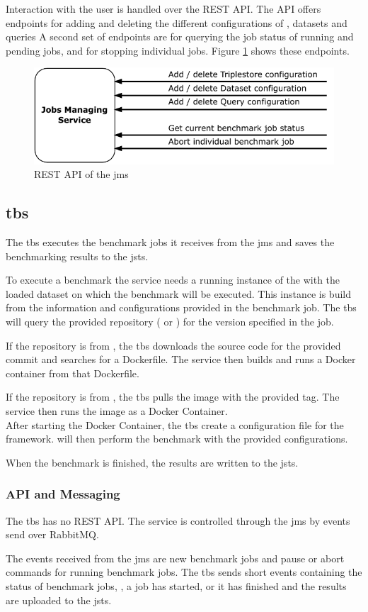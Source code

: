 Interaction with the user is handled over the REST API.
The API offers endpoints for adding and deleting the different configurations of \tsp{}, datasets and queries
A second set of endpoints are for querying the job status of running and pending jobs, and for stopping individual jobs.
Figure \ref{fig:rest_apis_approach_jms} shows these endpoints.
\begin{figure}[tbph]
	\centering
	\includegraphics[width=.57\textwidth]{figures/rest-apis-approach-jms.pdf}
	\caption{REST API of the \acl{jms}}
	\label{fig:rest_apis_approach_jms}
\end{figure}


\subsection{\acl{tbs}}
\label{sec:ts_benchmarking_service}
The \acf{tbs} executes the benchmark jobs it receives from the \ac{jms} and saves the benchmarking results to the \acl*{jsts}.

To execute a benchmark the service needs a running instance of the \ts{} with the loaded dataset on which the benchmark will be executed.
This instance is build from the information and configurations provided in the benchmark job.
The \ac{tbs} will query the provided repository (\gh{} or \dockh{}) for the version specified in the job.

If the repository is from \gh{}, the \ac{tbs} downloads the source code for the provided commit and searches for a Dockerfile.
The service then builds and runs a Docker container from that Dockerfile.

If the repository is from \dockh{}, the \ac{tbs} pulls the image with the provided tag.
The service then runs the image as a Docker Container.
\\

After starting the Docker Container, the \ac{tbs} create a configuration file for the \iguana{} framework.
\iguana{} will then perform the benchmark with the provided configurations.

When the benchmark is finished, the results are written to the \acl*{jsts}.

\subsubsection{API and Messaging}
\label{sec:benchmarking_api}
The \ac{tbs} has no REST API.
The service is controlled through the \ac{jms} by events send over RabbitMQ.

The events received from the \ac{jms} are new benchmark jobs and pause or abort commands for running benchmark jobs.
The \ac{tbs} sends short events containing the status of benchmark jobs, \eg, a job has started, or it has finished and the results are uploaded to the \acl{jsts}.